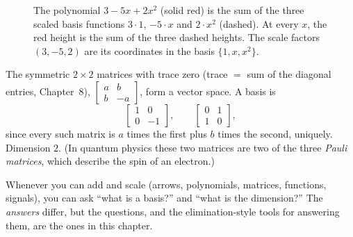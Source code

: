 \begin{figure}[htbp]
\centering
{}
\caption{The polynomial $3-5x+2x^2$ (solid red) is the sum of the three scaled basis
functions $3\cdot 1$, $-5\cdot x$ and $2\cdot x^2$ (dashed). At every $x$, the red height is the sum of the
three dashed heights. The scale factors $(3,-5,2)$ are its coordinates in the basis $\{1,x,x^2\}$.}
\label{ch14:fig-poly}
\end{figure}

\begin{example}
\label{ch14:ex-matrices}
The symmetric $2\times 2$ matrices with trace zero (trace $=$ sum of the diagonal entries, Chapter~8), $\begin{bmatrix} a & b\\ b &
-a\end{bmatrix}$, form a vector space. A basis is
\[
  \begin{bmatrix} 1 & 0\\ 0 & -1\end{bmatrix},\qquad
  \begin{bmatrix} 0 & 1\\ 1 & 0\end{bmatrix},
\]
since every such matrix is $a$ times the first plus $b$ times the second, uniquely.
Dimension $2$. (In quantum physics these two matrices are two of the three \emph{Pauli matrices},
which describe the spin of an electron.)
\end{example}

\begin{focusbox}
Whenever you can add and scale (arrows, polynomials,
matrices, functions, signals), you can ask ``what is a basis?'' and ``what is the
dimension?'' The \emph{answers} differ, but the questions, and the
elimination-style tools for answering them, are the ones in this chapter.
\end{focusbox}

